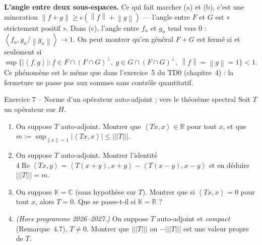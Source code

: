 \documentclass[11pt,a4paper]{article}
\newcommand{\R}{\mathbb{R}}
\newcommand{\C}{\mathbb{C}}
\newcommand{\K}{\mathbb{K}}
\newcommand{\norm}[1]{\left\|#1\right\|}
\newcommand{\opnorm}[1]{|\!|\!|#1|\!|\!|}
\newcommand{\ps}[2]{\left\langle #1,#2\right\rangle}
\renewcommand{\Re}{\operatorname{Re}}
\theoremstyle{definition}
\begin{document}
\begin{pointcle}
\textbf{L'angle entre deux sous-espaces.} Ce qui fait marcher (a) et (b), c'est une minoration $\norm{f+g}\ge c(\norm f+\norm g)$ — l'angle entre $F$ et $G$ est « strictement positif ». Dans (c), l'angle entre $f_n$ et $g_n$ tend vers $0$ : $\ps{f_n}{g_n/\norm{g_n}}\to1$. On peut montrer qu'en général $F+G$ est fermé si et seulement si $\sup\{|\ps fg|:f\in F\cap(F\cap G)^\perp,\ g\in G\cap(F\cap G)^\perp,\ \norm f=\norm g=1\}<1$. Ce phénomène est le même que dans l'exercice~5 du TD0 (chapitre~4) : la fermeture ne passe pas aux sommes sans contrôle quantitatif.
\end{pointcle}

\begin{exo}{Exercice 7 -- Norme d'un opérateur auto-adjoint ; vers le théorème spectral}
Soit $T$ un opérateur sur $H$.
\begin{enumerate}[label=(\alph*)]
  \item On suppose $T$ auto-adjoint. Montrer que $\ps{Tx}x\in\R$ pour tout $x$, et que $m:=\sup_{\norm x=1}|\ps{Tx}x|\le\opnorm T$.
  \item On suppose $T$ auto-adjoint. Montrer l'identité $4\Re\ps{Tx}y=\ps{T(x+y)}{x+y}-\ps{T(x-y)}{x-y}$ et en déduire $\opnorm T=m$.
  \item On suppose $\K=\C$ (sans hypothèse sur $T$). Montrer que si $\ps{Tx}x=0$ pour tout $x$, alors $T=0$. Que se passe-t-il si $\K=\R$ ?
  \item \emph{(Hors programme 2026--2027.)} On suppose $T$ auto-adjoint et \emph{compact} (Remarque~4.7), $T\ne0$. Montrer que $\opnorm T$ ou $-\opnorm T$ est une valeur propre de $T$.
\end{enumerate}
\end{exo}
\end{document}
